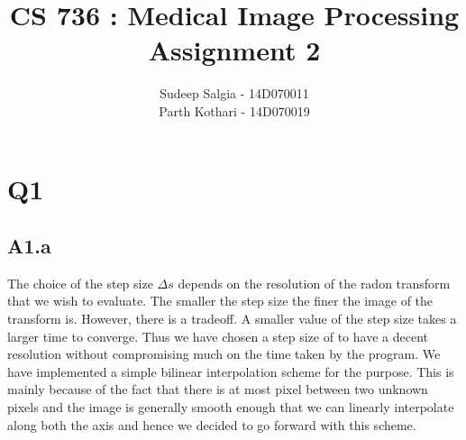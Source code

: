 \documentclass{article}
\title{CS 736 : Medical Image Processing Assignment 2}
\author{Sudeep Salgia - 14D070011\\
  Parth Kothari - 14D070019\\
}
\begin{document}
\maketitle

\section*{Q1}
\subsection*{A1.a}

The choice of the step size $ \Delta s $ depends on the resolution of the radon transform that we wish to evaluate. The smaller the step size the finer the image of the transform is. However, there is a tradeoff. A smaller value of the step size takes a larger time to converge. Thus we have chosen a step size of      to have a decent resolution without compromising much on the time taken by the program. We have implemented a simple bilinear interpolation scheme for the purpose. This is mainly because of the fact that there is at most pixel between two unknown pixels and the image is generally smooth enough that we can linearly interpolate along both the axis and hence we decided to go forward with this scheme.  





\end{document}
